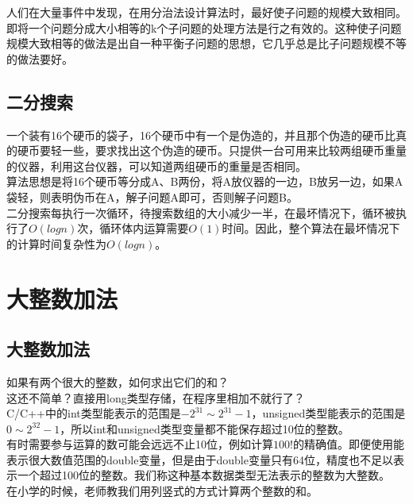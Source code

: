 人们在大量事件中发现，在用分治法设计算法时，最好使子问题的规模大致相同。即将一个问题分成大小相等的k个子问题的处理方法是行之有效的。这种使子问题规模大致相等的做法是出自一种平衡子问题的思想，它几乎总是比子问题规模不等的做法要好。

\subsection{二分搜索}

一个装有16个硬币的袋子，16个硬币中有一个是伪造的，并且那个伪造的硬币比真的硬币要轻一些，要求找出这个伪造的硬币。只提供一台可用来比较两组硬币重量的仪器，利用这台仪器，可以知道两组硬币的重量是否相同。 \\

算法思想是将16个硬币等分成A、B两份，将A放仪器的一边，B放另一边，如果A袋轻，则表明伪币在A，解子问题A即可，否则解子问题B。 \\

二分搜索每执行一次循环，待搜索数组的大小减少一半，在最坏情况下，循环被执行了$ O(logn) $次，循环体内运算需要$ O(1) $时间。因此，整个算法在最坏情况下的计算时间复杂性为$ O(logn) $。

\newpage

\section{大整数加法}

\subsection{大整数加法}

如果有两个很大的整数，如何求出它们的和？ \\

这还不简单？直接用long类型存储，在程序里相加不就行了？ \\

C/C++中的int类型能表示的范围是$ -2^{31} \sim 2^{31} - 1 $，unsigned类型能表示的范围是$ 0 \sim 2^{32} - 1 $，所以int和unsigned类型变量都不能保存超过10位的整数。 \\

有时需要参与运算的数可能会远远不止10位，例如计算$ 100! $的精确值。即便使用能表示很大数值范围的double变量，但是由于double变量只有64位，精度也不足以表示一个超过100位的整数。我们称这种基本数据类型无法表示的整数为大整数。 \\

在小学的时候，老师教我们用列竖式的方式计算两个整数的和。

